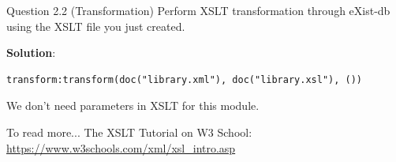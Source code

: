 \begin{frame}[fragile]{Question 2.2 (Transformation)}
Perform XSLT transformation through eXist-db using the XSLT file you just created.\\\vspace{5pt}

\textbf{Solution}:

\begin{lstlisting}[style=xml-small-nomargin]
transform:transform(doc("library.xml"), doc("library.xsl"), ())
\end{lstlisting}\vspace{5pt}

We don't need parameters in XSLT for this module.

\begin{block}{To read more...}
	The XSLT Tutorial on W3 School: \url{https://www.w3schools.com/xml/xsl_intro.asp}
\end{block}	
\end{frame}


